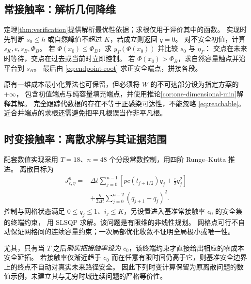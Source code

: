 \documentclass[11pt,a4paper,UTF8]{ctexart}
\theoremstyle{definition}
\begin{document}
\subsection{常接触率：解析几何降维}
定理\ref{thm:verification}提供解析最优性依据；求根仅用于评价其中的函数。
实现时先判断 $s_0\le h$ 或自然峰值不超过 $K$，若成立则返回 $q=0$。
对不安全初值，计算 $s_K,e,s_B,\Phi_B$。
若 $\Phi(x_0)\le\Phi_B$，求 $y_\Gamma(\Phi(x_0))$ 并比较 $s_0$ 与 $\eta_\Gamma$：
交点在未来时等待，交点在过去或当前时立即控制。
若 $\Phi(x_0)>\Phi_B$，求自然容量触点并沿平台到 $s_B$。
最后由 \eqref{eq:endpoint-root} 求正安全端点，拼接各段。

原有一维成本最小化算法也可保留，但必须将 $W$ 的不可达部分设为指定方案的 $+\infty$，
包含初值端点与纯容量填充端点，并使用推论\ref{cor:one-dimensional-min}解释其解。
完全跟踪代数根的存在不等于正感染可达性，不能忽略 \eqref{eq:reachable}。
近合并端点的求根还需避免把平凡根误当作非平凡根。

\subsection{时变接触率：离散求解与其证据范围}
配套数值实现采用 $T=18$、$n=48$ 个分段常数控制，用四阶 Runge--Kutta 推进。
离散目标为
\begin{equation}
\begin{aligned}
J_{\varepsilon,\eta}^n={}&\Delta t\sum_{j=0}^{n-1}
\left[pc(t_{j+1/2})q_j+\frac\varepsilon2q_j^2\right]\\
&+\frac{\eta}{2\Delta t}\sum_{j=0}^{n-2}(q_{j+1}-q_j)^2.
\end{aligned}
\label{eq:discrete-objective}
\end{equation}
控制与网格状态满足 $0\le q_j\le1$、$i_j\le K$，另设置进入基准常接触率 $c_0$ 的安全集的终端约束，
用 SLSQP 求解。该问题是有限维的非线性规划。
网格点可行不自动保证网格间的连续容量约束；一次局部优化收敛不证明全局极小或唯一性。

尤其，只有当 $T$ 之后\emph{确实把接触率设为} $c_0$，该终端约束才直接给出相应的零成本安全延拓。
若接触率仅渐近趋于 $c_0$ 而在任意有限时间仍高于它，则基准安全边界上的终点不自动对真实未来路径安全。
因此下列时变计算保留为原离散问题的数值示例，未建立其与无穷时域连续问题的严格等价性。
\end{document}
